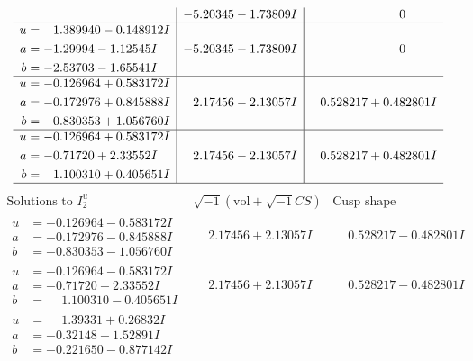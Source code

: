 \documentclass[1p]{elsarticle_modified}
\theoremstyle{definition}
\newcommand{\I}{\sqrt{-1}}
\begin{document}
$$\begin{array}{c|c|c}
 & -5.20345 - 1.73809 I & \phantom{-0.000000 } 0 \\ \hline\begin{aligned}
u &= \phantom{-}1.389940 - 0.148912 I \\
a &= -1.29994 - 1.12545 I \\
b &= -2.53703 - 1.65541 I\end{aligned}
 & -5.20345 - 1.73809 I & \phantom{-0.000000 } 0 \\ \hline\begin{aligned}
u &= -0.126964 + 0.583172 I \\
a &= -0.172976 + 0.845888 I \\
b &= -0.830353 + 1.056760 I\end{aligned}
 & \phantom{-}2.17456 - 2.13057 I & \phantom{-}0.528217 + 0.482801 I \\ \hline\begin{aligned}
u &= -0.126964 + 0.583172 I \\
a &= -0.71720 + 2.33552 I \\
b &= \phantom{-}1.100310 + 0.405651 I\end{aligned}
 & \phantom{-}2.17456 - 2.13057 I & \phantom{-}0.528217 + 0.482801 I\\
 \hline 
 \end{array}$$\newpage$$\begin{array}{c|c|c}  
\text{Solutions to }I^u_{2}& \I (\text{vol} + \sqrt{-1}CS) & \text{Cusp shape}\\
 \hline 
\begin{aligned}
u &= -0.126964 - 0.583172 I \\
a &= -0.172976 - 0.845888 I \\
b &= -0.830353 - 1.056760 I\end{aligned}
 & \phantom{-}2.17456 + 2.13057 I & \phantom{-}0.528217 - 0.482801 I \\ \hline\begin{aligned}
u &= -0.126964 - 0.583172 I \\
a &= -0.71720 - 2.33552 I \\
b &= \phantom{-}1.100310 - 0.405651 I\end{aligned}
 & \phantom{-}2.17456 + 2.13057 I & \phantom{-}0.528217 - 0.482801 I \\ \hline\begin{aligned}
u &= \phantom{-}1.39331 + 0.26832 I \\
a &= -0.32148 - 1.52891 I \\
b &= -0.221650 - 0.877142 I\end{aligned}

\end{array}$$
\end{document}
